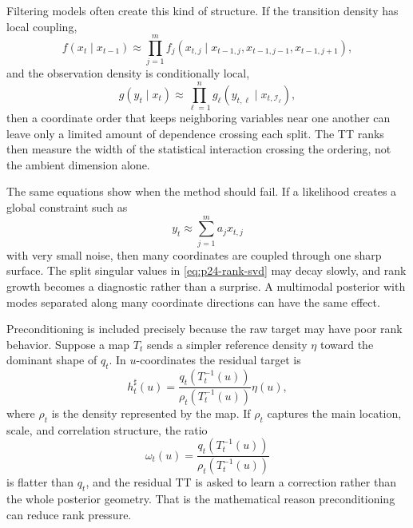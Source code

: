 \documentclass[11pt]{article}
\numberwithin{equation}{section}
\begin{document}
Filtering models often create this kind of structure.  If the transition
density has local coupling,
\begin{equation}
    f(x_t\mid x_{t-1})
    \approx
    \prod_{j=1}^m f_j(x_{t,j}\mid x_{t-1,j},x_{t-1,j-1},x_{t-1,j+1}),
    \label{eq:p24-rank-local-transition}
\end{equation}
and the observation density is conditionally local,
\begin{equation}
    g(y_t\mid x_t)
    \approx
    \prod_{\ell=1}^n g_\ell(y_{t,\ell}\mid x_{t,\mathcal I_\ell}),
    \label{eq:p24-rank-local-observation}
\end{equation}
then a coordinate order that keeps neighboring variables near one another can
leave only a limited amount of dependence crossing each split.  The TT ranks
then measure the width of the statistical interaction crossing the ordering,
not the ambient dimension alone.

The same equations show when the method should fail.  If a likelihood creates
a global constraint such as
\begin{equation}
    y_t\approx \sum_{j=1}^m a_j x_{t,j}
    \label{eq:p24-rank-global-constraint}
\end{equation}
with very small noise, then many coordinates are coupled through one sharp
surface.  The split singular values in \eqref{eq:p24-rank-svd} may decay
slowly, and rank growth becomes a diagnostic rather than a surprise.  A
multimodal posterior with modes separated along many coordinate directions can
have the same effect.

Preconditioning is included precisely because the raw target may have poor
rank behavior.  Suppose a map \(T_t\) sends a simpler reference density
\(\eta\) toward the dominant shape of \(q_t\).  In \(u\)-coordinates the
residual target is
\begin{equation}
    h^\sharp_t(u)
    =
    \frac{q_t(T_t^{-1}(u))}
         {\rho_t(T_t^{-1}(u))}
    \eta(u),
    \label{eq:p24-rank-residual}
\end{equation}
where \(\rho_t\) is the density represented by the map.  If \(\rho_t\) captures
the main location, scale, and correlation structure, the ratio
\begin{equation}
    \omega_t(u)
    =
    \frac{q_t(T_t^{-1}(u))}
         {\rho_t(T_t^{-1}(u))}
    \label{eq:p24-rank-residual-ratio}
\end{equation}
is flatter than \(q_t\), and the residual TT is asked to learn a correction
rather than the whole posterior geometry.  That is the mathematical reason
preconditioning can reduce rank pressure.
\end{document}
